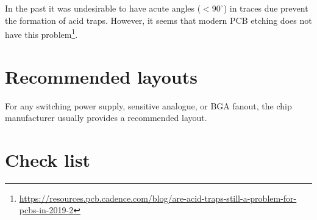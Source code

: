 In the past it was undesirable to have acute angles ($<90^{\circ}$) in
traces due prevent the formation of acid traps.  However, it seems
that modern PCB etching does not have this
problem\footnote{\url{https://resources.pcb.cadence.com/blog/are-acid-traps-still-a-problem-for-pcbs-in-2019-2}}.


\section{Recommended layouts}

For any switching power supply, sensitive analogue, or BGA fanout, the
chip manufacturer usually provides a recommended layout.

\section{Check list}
\label{PCB-check-list}

